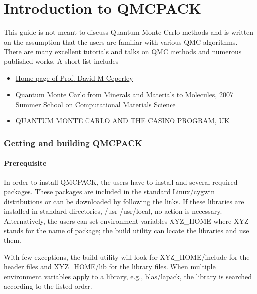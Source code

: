 \part{Introduction to QMCPACK}\label{intro.part}%

This guide is not meant to discuss Quantum Monte Carlo methods and is
written on the assumption that the users are familiar with various QMC
algorithms. There are many excellent tutorials and talks on QMC methods
and numerous published works. A short list includes 

\begin{itemize}
\item{}\href{http://www.physics.uiuc.edu/people/Ceperley/}{Home page of Prof. David M Ceperley}  
\item{}\href{http://cms.mcc.uiuc.edu/wiki/display/ss2007qmc/Home}{
Quantum Monte Carlo from Minerals and Materials to Molecules,
2007 Summer School on Computational Materials Science}
\item{}\href{http://www.tcm.phy.cam.ac.uk/~mdt26/casino2.html}{QUANTUM MONTE CARLO AND THE CASINO PROGRAM, UK}  
\end{itemize}

\section{Getting and building QMCPACK}\label{start.sec}

\subsection{Prerequisite}

In order to install QMCPACK, the users have to install \cmake and several
required packages. These packages are included in the standard Linux/cygwin
distributions or can be downloaded by following the links. If these libraries
are installed in standard directories, /usr /usr/local, no action is necessary.
Alternatively, the users can set environment variables XYZ\_HOME where XYZ
stands for the name of package; the build utility can locate the libraries and
use them.

With few exceptions, the build utility \cmake will look for XYZ\_HOME/include
for the header files and XYZ\_HOME/lib for the library files.  When multiple
environment variables apply to a library, e.g., blas/lapack, the library is
searched according to the listed order. 

